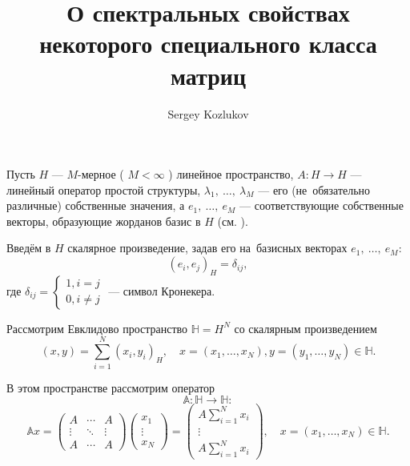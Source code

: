 \documentclass[a4paper]{article}
\title{О спектральных свойствах некоторого специального класса матриц}
\author{Sergey Kozlukov}
\begin{document}
\maketitle

Пусть \( H \) --- \( M \)-мерное ( \( M < \infty \) ) линейное пространство,
\( A: H\to H \) --- линейный оператор простой структуры,
\( \lambda_1,~\ldots,~\lambda_M \) --- его (не~обязательно различные)
собственные значения, а \( e_1,~\ldots,~e_M \) --- соответствующие
собственные векторы, образующие жорданов базис в \( H \) (см. \cite{baskakov-algebra}).

Введём в \( H \) скалярное произведение, задав его на~базисных векторах
\( e_1,~\ldots,~e_M \):
\[ (e_i,e_j)_H = \delta_{ij}, \]
где \( \delta_{ij} = \left\{\begin{aligned} 1, i=j\\ 0, i\neq j\end{aligned}\right. \) --- символ Кронекера.

Рассмотрим Евклидово пространство \( \mathbb{H}=H^N \)
со скалярным произведением
\[ (x, y) = \sum_{i=1}^N (x_i,y_i)_H, \quad x=(x_1,\ldots,x_N),y=(y_1,\ldots,y_N) \in \mathbb{H}. \] 

В этом пространстве рассмотрим оператор
\[ \mathbb{A}: \mathbb{H}\to \mathbb{H}: \]
\[ \mathbb{A}x =
    \begin{pmatrix}
        A & \cdots & A \\
        \vdots & \ddots & \vdots \\
        A & \cdots & A
    \end{pmatrix}
    \begin{pmatrix}
        x_1 \\
        \vdots \\
        x_N
    \end{pmatrix}
    = \begin{pmatrix}
        A \sum_{i=1}^N x_i \\
        \vdots \\
        A \sum_{i=1}^N x_i
    \end{pmatrix},
    \quad x=(x_1,\ldots,x_N) \in \mathbb{H}. \]
\end{document}
